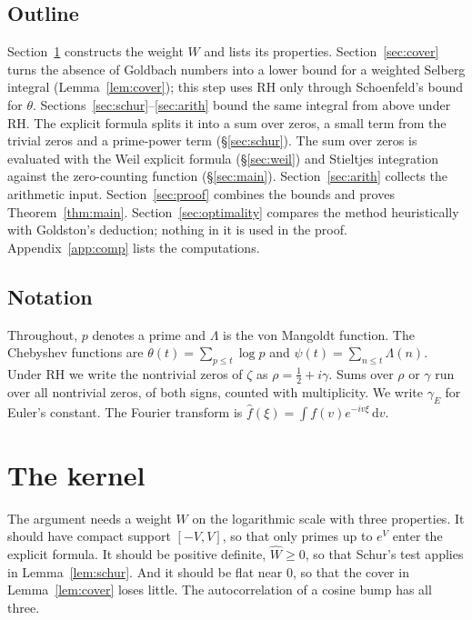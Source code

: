\documentclass[11pt]{amsart}
\theoremstyle{remark}
\newcommand{\dd}{\,\mathrm{d}}
\newcommand{\Wh}{\widehat W}
\begin{document}
\subsection{Outline}
Section~\ref{sec:kernel} constructs the weight $W$ and lists its properties. Section~\ref{sec:cover} turns the absence of Goldbach numbers into a lower bound for a weighted Selberg integral (Lemma~\ref{lem:cover}); this step uses RH only through Schoenfeld's bound for $\theta$. Sections~\ref{sec:schur}--\ref{sec:arith} bound the same integral from above under RH. The explicit formula splits it into a sum over zeros, a small term from the trivial zeros and a prime-power term (\S\ref{sec:schur}). The sum over zeros is evaluated with the Weil explicit formula (\S\ref{sec:weil}) and Stieltjes integration against the zero-counting function (\S\ref{sec:main}). Section~\ref{sec:arith} collects the arithmetic input. Section~\ref{sec:proof} combines the bounds and proves Theorem~\ref{thm:main}. Section~\ref{sec:optimality} compares the method heuristically with Goldston's deduction; nothing in it is used in the proof. Appendix~\ref{app:comp} lists the computations.

\subsection{Notation}
Throughout, $p$ denotes a prime and $\Lambda$ is the von Mangoldt function. The Chebyshev functions are $\theta(t)=\sum_{p\le t}\log p$ and $\psi(t)=\sum_{n\le t}\Lambda(n)$. Under RH we write the nontrivial zeros of $\zeta$ as $\rho=\frac12+i\gamma$. Sums over $\rho$ or $\gamma$ run over all nontrivial zeros, of both signs, counted with multiplicity. We write $\gamma_E$ for Euler's constant. The Fourier transform is $\widehat f(\xi)=\int f(v)e^{-iv\xi}\dd v$.

\section{The kernel}\label{sec:kernel}

The argument needs a weight $W$ on the logarithmic scale with three properties. It should have compact support $[-V,V]$, so that only primes up to $e^V$ enter the explicit formula. It should be positive definite, $\Wh\ge0$, so that Schur's test applies in Lemma~\ref{lem:schur}. And it should be flat near $0$, so that the cover in Lemma~\ref{lem:cover} loses little. The autocorrelation of a cosine bump has all three.
\end{document}
